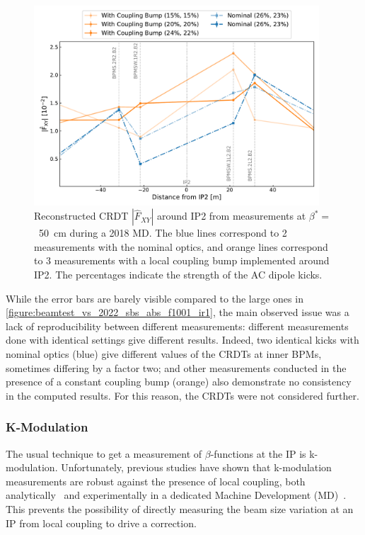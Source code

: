 \begin{figure}[!htb]
    \centering
    \includegraphics*[width=0.95\textwidth]{Figures/IR_Coupling_Correction/crdt_fxy_nominal_vs_colin_md_2018.pdf}
    \caption{Reconstructed CRDT \(|\hat{F}_{XY}|\) around IP\num{2} from measurements at \(\beta^{\ast} =\)~\qty{50}{\centi\meter} during a \num{2018} MD. The \textcolor{mplblue}{blue} lines correspond to \num{2} measurements with the nominal optics, and \textcolor{mplorange}{orange} lines correspond to \num{3} measurements with a local coupling bump implemented around IP\num{2}. The percentages indicate the strength of the AC dipole kicks.}
    \label{figure:crdt_fxy_nominal_vs_colin_md_2018}
\end{figure}

While the error bars are barely visible compared to the large ones in \cref{figure:beamtest_vs_2022_sbs_abs_f1001_ir1}, the main observed issue was a lack of reproducibility between different measurements: different measurements done with identical settings give different results.
Indeed, two identical kicks with nominal optics (\textcolor{mplblue}{blue}) give different values of the CRDTs at inner BPMs, sometimes differing by a factor two; and other measurements conducted in the presence of a constant coupling bump (\textcolor{mplorange}{orange}) also demonstrate no consistency in the computed results.
For this reason, the CRDTs were not considered further.

\subsubsection*{K-Modulation}

The usual technique to get a measurement of \(\beta\)-functions at the IP is k-modulation.
Unfortunately, previous studies have shown that k-modulation measurements are robust against the presence of local coupling, both analytically~\cite{PRAB:Hofer:Coupling_Local_Observables, PRAB:Carlier:KModulation_HiLumi} and experimentally in a dedicated Machine Development (MD)~\cite{CERN:Persson:Local_Coupling_IP}.
This prevents the possibility of directly measuring the beam size variation at an IP from local coupling to drive a correction. 

